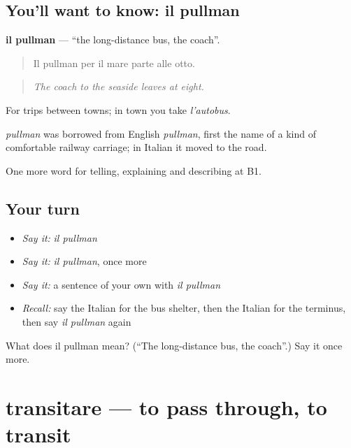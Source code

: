 \subsection*{You'll want to know: il pullman}
\textbf{il pullman} — \textquotedblleft{}the long-distance bus, the coach\textquotedblright{}.

\begin{quote}
Il pullman per il mare parte alle otto.
\end{quote}

\begin{quote}
\emph{The coach to the seaside leaves at eight.}
\end{quote}

For trips between towns; in town you take \emph{l'autobus}.

\begin{cousinweb}
\emph{pullman} was borrowed from English \emph{pullman}, first the name of a kind of comfortable railway carriage; in Italian it moved to the road.
\end{cousinweb}

\begin{grammarlens}[title={What you've built}]
One more word for telling, explaining and describing at B1.
\end{grammarlens}

\subsection*{Your turn}
\begin{itemize}
\raggedright
  \item \emph{Say it:} \emph{il pullman}
  \item \emph{Say it:} \emph{il pullman}, once more
  \item \emph{Say it:} a sentence of your own with \emph{il pullman}
  \item \emph{Recall:} say the Italian for the bus shelter, then the Italian for the terminus, then say \emph{il pullman} again
\end{itemize}

\begin{tcolorbox}[breakable,colback=teal!4,colframe=teal!35!black,title={Before you move on}]
What does il pullman mean? (\textquotedblleft{}The long-distance bus, the coach\textquotedblright{}.) Say it once more.
\end{tcolorbox}
\section[transitare]{transitare — to pass through, to transit}

